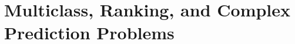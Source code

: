 \chapter{Multiclass, Ranking, and Complex Prediction Problems}

\begin{ex}
\end{ex}

\begin{ex}
\end{ex}

\begin{ex}
\end{ex}

\begin{ex}
\end{ex}

\begin{ex}
\end{ex}
